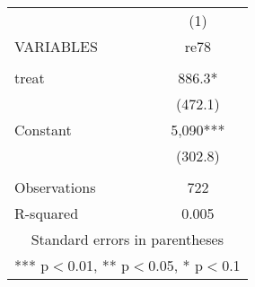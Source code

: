 \begin{tabular}{lc} \hline
 & (1) \\
VARIABLES & re78 \\ \hline
 &  \\
treat & 886.3* \\
 & (472.1) \\
Constant & 5,090*** \\
 & (302.8) \\
 &  \\
Observations & 722 \\
 R-squared & 0.005 \\ \hline
\multicolumn{2}{c}{ Standard errors in parentheses} \\
\multicolumn{2}{c}{ *** p$<$0.01, ** p$<$0.05, * p$<$0.1} \\
\end{tabular}
